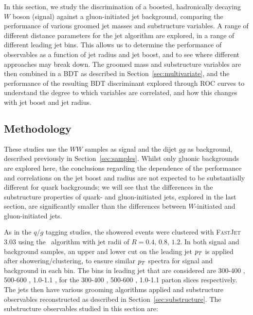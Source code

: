 In this section, we study the discrimination of a boosted, hadronically decaying $W$ boson (signal) against a gluon-initiated jet
background, comparing the performance of various groomed jet
masses and substructure variables.
A range of different distance parameters for the \antikt jet
algorithm are explored, in a range of different leading jet \pt bins.
This allows us to determine the
performance of observables as a function of jet radius and jet boost, and to see
where different approaches may break down. The groomed
mass and substructure variables are then combined in a BDT as described in Section~\ref{sec:multivariate}, and the performance of the resulting BDT discriminant
explored through ROC curves to understand the degree to which
variables are correlated, and how
this changes with jet boost and jet radius. 

\subsection{Methodology}

These studies use the $WW$ samples as signal and the dijet $gg$ as background, described previously in Section~\ref{sec:samples}. Whilst only gluonic backgrounds
are explored here, the conclusions regarding the dependence of the
performance and correlations on the jet boost and radius are not
expected to be substantially different for quark backgrounds; we will
see that the differences in the substructure properties of quark- and
gluon-initiated jets, explored in the last section, are significantly
smaller than the differences between $W$-initiated and gluon-initiated jets.

As in the $q/g$ tagging studies, the showered events were clustered with \textsc{FastJet}
3.03 using
the \antikt~algorithm with jet radii of $R = 0.4,\, 0.8,\, 1.2$. In
both signal and background samples, an upper and lower cut on
the leading jet $p_T$ is applied after showering/clustering, to ensure
similar $p_T$ spectra for signal and background in each \pt bin. The bins
in leading jet \pt that are considered are 300-400 \GeV, 500-600 \GeV,
1.0-1.1 \TeV, for the 300-400 \GeV, 500-600 \GeV,
1.0-1.1 \TeV parton \pt slices respectively. The jets then have various
grooming algorithms applied and substructure observables
reconstructed as described in
Section~\ref{sec:substructure}. The substructure observables
studied in this section are: 

